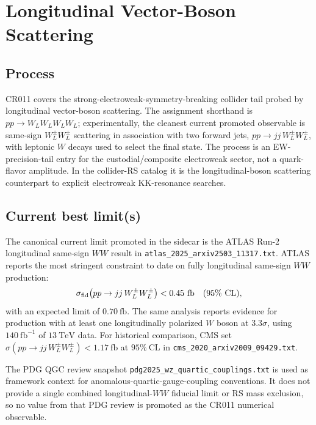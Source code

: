 
\section{\texorpdfstring{Longitudinal Vector-Boson Scattering}{Longitudinal Vector-Boson Scattering}}

\subsection*{Process}
CR011 covers the strong-electroweak-symmetry-breaking collider tail probed by
longitudinal vector-boson scattering.  The assignment shorthand is
\(pp\to W_L W_L W_L W_L\); experimentally, the cleanest current promoted
observable is same-sign \(W_L^\pm W_L^\pm\) scattering in association with two
forward jets, \(pp\to jj\,W_L^\pm W_L^\pm\), with leptonic \(W\) decays used
to select the final state.  The process is an EW-precision-tail entry for the
custodial/composite electroweak sector, not a quark-flavor amplitude.  In the
collider-RS catalog it is the longitudinal-boson scattering counterpart to
explicit electroweak KK-resonance searches.

\subsection*{Current best limit(s)}
The canonical current limit promoted in the sidecar is the ATLAS Run-2
longitudinal same-sign \(WW\) result in
\texttt{atlas\_2025\_arxiv2503\_11317.txt}.  ATLAS reports the most stringent
constraint to date on fully longitudinal same-sign \(WW\) production:
\[
  \sigma_{\rm fid}\!\left(pp\to jj\,W_L^\pm W_L^\pm\right)
  < 0.45~\mathrm{fb}\quad(95\%~\mathrm{CL}),
\]
with an expected limit of \(0.70~\mathrm{fb}\).  The same analysis reports
evidence for production with at least one longitudinally polarized \(W\) boson
at \(3.3\sigma\), using \(140~\mathrm{fb}^{-1}\) of \(13~\mathrm{TeV}\) data.
For historical comparison, CMS set
\(\sigma(pp\to jj\,W_L^\pm W_L^\pm)<1.17~\mathrm{fb}\) at \(95\%~\mathrm{CL}\)
in \texttt{cms\_2020\_arxiv2009\_09429.txt}.

The PDG QGC review snapshot
\texttt{pdg2025\_wz\_quartic\_couplings.txt} is used as framework context for
anomalous-quartic-gauge-coupling conventions.  It does not provide a single
combined longitudinal-\(WW\) fiducial limit or RS mass exclusion, so no value
from that PDG review is promoted as the CR011 numerical observable.

